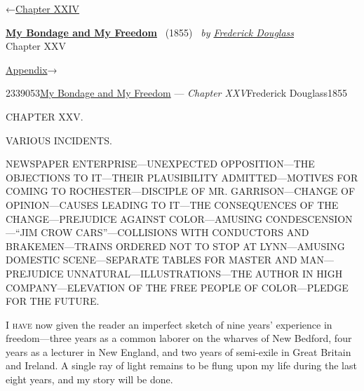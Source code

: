 \hypertarget{headerContainer}{}
\hypertarget{navigationHeader}{}
\protect\hypertarget{headerprevious}{}{←\href{/wiki/My_Bondage_and_My_Freedom_(1855)/Chapter_XXIV}{Chapter
XXIV}}

\textbf{\protect\hypertarget{header_title_text}{}{\href{/wiki/My_Bondage_and_My_Freedom_(1855)}{My
Bondage and My Freedom}}} ~(1855)~ \emph{by
\href{/wiki/Author:Frederick_Douglass}{\protect\hypertarget{header_author_text}{}{{Frederick
Douglass}}}}\\
\protect\hypertarget{header_section_text}{}{Chapter XXV}

\protect\hypertarget{headernext}{}{\href{/wiki/My_Bondage_and_My_Freedom_(1855)/Appendix}{Appendix}→}

\hypertarget{navigationNotes}{}

\hypertarget{ws-data}{}
\protect\hypertarget{ws-article-id}{}{2339053}\protect\hypertarget{ws-title}{}{\href{/wiki/My_Bondage_and_My_Freedom_(1855)}{My
Bondage and My Freedom} --- \emph{Chapter
XXV}}\protect\hypertarget{ws-author}{}{Frederick
Douglass}\protect\hypertarget{ws-year}{}{1855}

{\protect\hypertarget{392}{}{}}

{CHAPTER XXV.}

VARIOUS INCIDENTS.

{NEWSPAPER ENTERPRISE---UNEXPECTED OPPOSITION---THE OBJECTIONS TO
IT---THEIR PLAUSIBILITY ADMITTED---MOTIVES FOR COMING TO
ROCHESTER---DISCIPLE OF MR. GARRISON---CHANGE OF OPINION---CAUSES
LEADING TO IT---THE CONSEQUENCES OF THE CHANGE---PREJUDICE AGAINST
COLOR---AMUSING CONDESCENSION---``JIM CROW CARS''---COLLISIONS WITH
CONDUCTORS AND BRAKEMEN---TRAINS ORDERED NOT TO STOP AT LYNN---AMUSING
DOMESTIC SCENE---SEPARATE TABLES FOR MASTER AND MAN---PREJUDICE
UNNATURAL---ILLUSTRATIONS---THE AUTHOR IN HIGH COMPANY---ELEVATION OF
THE FREE PEOPLE OF COLOR---PLEDGE FOR THE FUTURE.}

\textsc{I have} now given the reader an imperfect sketch of nine years'
experience in freedom---three years as a common laborer on the wharves
of New Bedford, four years as a lecturer in New England, and two years
of semi-exile in Great Britain and Ireland. A single ray of light
remains to be flung upon my life during the last eight years, and my
story will be done.

